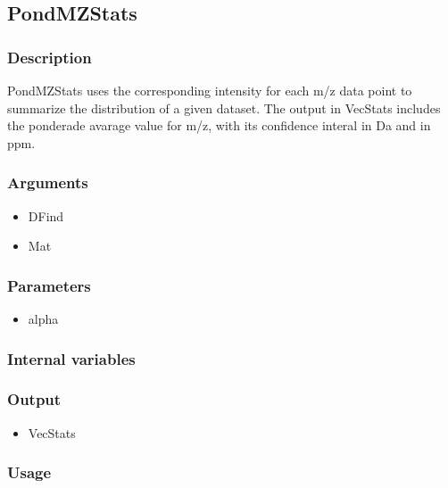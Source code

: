 \subsection{PondMZStats}
\subsubsection{Description}
PondMZStats uses the corresponding intensity for each m/z data point to summarize the distribution of a given dataset. The output in VecStats includes the ponderade avarage value for m/z, with its confidence interal in Da and in ppm.
\subsubsection{Arguments}
\begin{itemize}
\item DFind
\item Mat
\end{itemize}
\subsubsection{Parameters}
\begin{itemize}
\item alpha
\end{itemize}
\subsubsection{Internal variables}
\subsubsection{Output}
\begin{itemize}
\item VecStats
\end{itemize}
\subsubsection{Usage}


